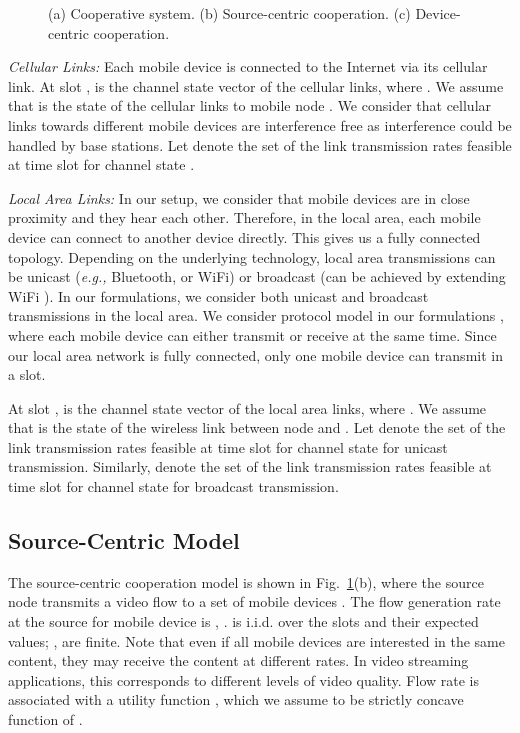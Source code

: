 \documentclass[conference]{IEEEtran}
\newcommand{\eg}{{\em e.g., }}
\begin{document}
\begin{figure}[t!]
\centering
{}  
\vspace{-5pt}
\caption{(a) Cooperative system. (b) Source-centric cooperation. (c) Device-centric cooperation.}
\vspace{-10pt}
\label{fig:forward_backward-system}
\end{figure}

{\em Cellular Links:} Each mobile device  is connected to the Internet via its cellular link. At slot ,  is the channel state vector of the cellular links, where . We assume that  is the state of the cellular links to mobile node . We consider that cellular links towards different mobile devices are interference free as interference could be handled by base stations. Let  denote the set of the link transmission rates feasible at time slot  for channel state .


{\em Local Area Links:}
In our setup, we consider that mobile devices are in close proximity and they hear each other. Therefore, in the local area, each mobile device can connect to another device directly. This gives us a fully connected topology. Depending on the underlying technology, local area transmissions can be unicast (\eg Bluetooth, or WiFi) or broadcast (can be achieved by extending WiFi \cite{microcast}). In our formulations, we consider both unicast and broadcast transmissions in the local area. We consider protocol model in our formulations \cite{gupta_interference_model}, where each mobile device can either transmit or receive at the same time. Since our local area network is fully connected, only one mobile device can transmit in a slot.

At slot ,  is the channel state vector of the local area links, where . We assume that  is the state of the wireless link between node  and . Let  denote the set of the link transmission rates feasible at time slot  for channel state  for unicast transmission. Similarly,  denote the set of the link transmission rates feasible at time slot  for channel state  for broadcast transmission.


\subsection{Source-Centric Model}
The source-centric cooperation model is shown in Fig.~\ref{fig:forward_backward-system}(b), where the source node transmits a video flow to a set of mobile devices . The flow generation rate at the source for mobile device  is , .  is i.i.d. over the slots and their expected values; ,  are finite. Note that even if all mobile devices are interested in the same content, they may receive the content at different rates. In video streaming applications, this corresponds to different levels of video quality. Flow rate  is associated with a utility function , which we assume to be strictly concave function of .
\end{document}
